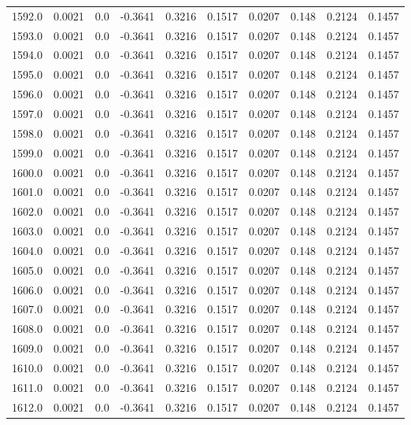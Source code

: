 \begin{longtable}{lrrrrrrrrr}
1592.0 & 0.0021 & 0.0 & -0.3641 & 0.3216 & 0.1517 & 0.0207 & 0.148 & 0.2124 & 0.1457 \\
1593.0 & 0.0021 & 0.0 & -0.3641 & 0.3216 & 0.1517 & 0.0207 & 0.148 & 0.2124 & 0.1457 \\
1594.0 & 0.0021 & 0.0 & -0.3641 & 0.3216 & 0.1517 & 0.0207 & 0.148 & 0.2124 & 0.1457 \\
1595.0 & 0.0021 & 0.0 & -0.3641 & 0.3216 & 0.1517 & 0.0207 & 0.148 & 0.2124 & 0.1457 \\
1596.0 & 0.0021 & 0.0 & -0.3641 & 0.3216 & 0.1517 & 0.0207 & 0.148 & 0.2124 & 0.1457 \\
1597.0 & 0.0021 & 0.0 & -0.3641 & 0.3216 & 0.1517 & 0.0207 & 0.148 & 0.2124 & 0.1457 \\
1598.0 & 0.0021 & 0.0 & -0.3641 & 0.3216 & 0.1517 & 0.0207 & 0.148 & 0.2124 & 0.1457 \\
1599.0 & 0.0021 & 0.0 & -0.3641 & 0.3216 & 0.1517 & 0.0207 & 0.148 & 0.2124 & 0.1457 \\
1600.0 & 0.0021 & 0.0 & -0.3641 & 0.3216 & 0.1517 & 0.0207 & 0.148 & 0.2124 & 0.1457 \\
1601.0 & 0.0021 & 0.0 & -0.3641 & 0.3216 & 0.1517 & 0.0207 & 0.148 & 0.2124 & 0.1457 \\
1602.0 & 0.0021 & 0.0 & -0.3641 & 0.3216 & 0.1517 & 0.0207 & 0.148 & 0.2124 & 0.1457 \\
1603.0 & 0.0021 & 0.0 & -0.3641 & 0.3216 & 0.1517 & 0.0207 & 0.148 & 0.2124 & 0.1457 \\
1604.0 & 0.0021 & 0.0 & -0.3641 & 0.3216 & 0.1517 & 0.0207 & 0.148 & 0.2124 & 0.1457 \\
1605.0 & 0.0021 & 0.0 & -0.3641 & 0.3216 & 0.1517 & 0.0207 & 0.148 & 0.2124 & 0.1457 \\
1606.0 & 0.0021 & 0.0 & -0.3641 & 0.3216 & 0.1517 & 0.0207 & 0.148 & 0.2124 & 0.1457 \\
1607.0 & 0.0021 & 0.0 & -0.3641 & 0.3216 & 0.1517 & 0.0207 & 0.148 & 0.2124 & 0.1457 \\
1608.0 & 0.0021 & 0.0 & -0.3641 & 0.3216 & 0.1517 & 0.0207 & 0.148 & 0.2124 & 0.1457 \\
1609.0 & 0.0021 & 0.0 & -0.3641 & 0.3216 & 0.1517 & 0.0207 & 0.148 & 0.2124 & 0.1457 \\
1610.0 & 0.0021 & 0.0 & -0.3641 & 0.3216 & 0.1517 & 0.0207 & 0.148 & 0.2124 & 0.1457 \\
1611.0 & 0.0021 & 0.0 & -0.3641 & 0.3216 & 0.1517 & 0.0207 & 0.148 & 0.2124 & 0.1457 \\
1612.0 & 0.0021 & 0.0 & -0.3641 & 0.3216 & 0.1517 & 0.0207 & 0.148 & 0.2124 & 0.1457 \\

\end{longtable}
